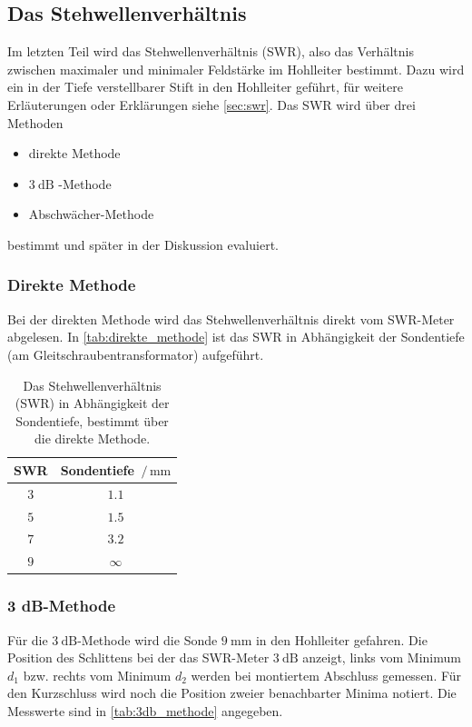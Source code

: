 \subsection{Das Stehwellenverhältnis}
Im letzten Teil wird das Stehwellenverhältnis (SWR), also das Verhältnis zwischen maximaler und minimaler Feldstärke im Hohlleiter bestimmt.
Dazu wird ein in der Tiefe verstellbarer Stift in den Hohlleiter geführt, für weitere Erläuterungen oder Erklärungen siehe \autoref{sec:swr}.
Das SWR wird über drei Methoden
\begin{itemize}
    \item direkte Methode
    \item $\SI{3}{\dB}$ -Methode
    \item Abschwächer-Methode
\end{itemize}
bestimmt und später in der Diskussion evaluiert.

\subsubsection{Direkte Methode}
Bei der direkten Methode wird das Stehwellenverhältnis direkt vom SWR-Meter abgelesen.
In \autoref{tab:direkte_methode} ist das SWR in Abhängigkeit der Sondentiefe (am Gleitschraubentransformator) aufgeführt.

\begin{table}
    \centering
    \caption{Das Stehwellenverhältnis (SWR) in Abhängigkeit der Sondentiefe, bestimmt über die direkte Methode.}
    \label{tab:direkte_methode}
    \begin{tabular}{c c}
        \toprule
        SWR & Sondentiefe $\,/\, \si{\milli\metre}$ \\
        \midrule
        $3$ & $1.1$ \\
        $5$ & $1.5$ \\
        $7$ & $3.2$ \\
        $9$ & $\infty$ \\
        \bottomrule
    \end{tabular}
\end{table}
\FloatBarrier

\subsubsection{3 dB-Methode}
Für die $\SI{3}{\dB}$-Methode wird die Sonde $\SI{9}{\milli\metre}$ in den Hohlleiter gefahren.
Die Position des Schlittens bei der das SWR-Meter $\SI{3}{\dB}$ anzeigt, links vom Minimum $d_1$ bzw. rechts vom Minimum $d_2$ werden bei montiertem Abschluss gemessen.
Für den Kurzschluss wird noch die Position zweier benachbarter Minima notiert.
Die Messwerte sind in \autoref{tab:3db_methode} angegeben.

